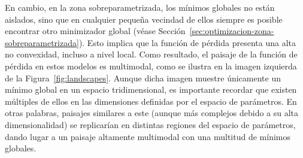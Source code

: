 En cambio, en la zona sobreparametrizada, los mínimos globales no están aislados, sino que en cualquier pequeña vecindad de ellos siempre es posible encontrar otro minimizador global (véase Sección~\ref{sec:optimizacion-zona-sobreparametrizada}). Esto implica que la función de pérdida presenta una alta no convexidad, incluso a nivel local. Como resultado, el paisaje de la función de pérdida en estos modelos es multimodal, como se ilustra en la imagen izquierda de la Figura~\ref{fig:landscapes}. Aunque dicha imagen muestre únicamente un mínimo global en un espacio tridimensional, es importante recordar que existen múltiples de ellos en las dimensiones definidas por el espacio de parámetros. En otras palabras, paisajes similares a este (aunque más complejos debido a su alta dimensionalidad) se replicarían en distintas regiones del espacio de parámetros, dando lugar a un paisaje altamente multimodal con una multitud de mínimos globales. 

